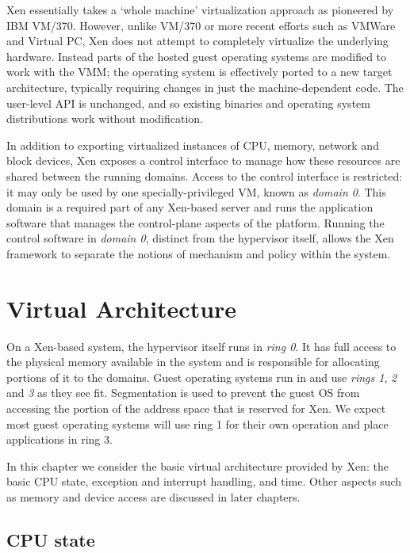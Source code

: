 \documentclass[11pt,twoside,final,openright]{xenstyle}
\begin{document}
Xen essentially takes a `whole machine' virtualization approach as
pioneered by IBM VM/370.  However, unlike VM/370 or more recent
efforts such as VMWare and Virtual PC, Xen does not attempt to
completely virtualize the underlying hardware.  Instead parts of the
hosted guest operating systems are modified to work with the VMM; the
operating system is effectively ported to a new target architecture,
typically requiring changes in just the machine-dependent code.  The
user-level API is unchanged, and so existing binaries and operating
system distributions work without modification.

In addition to exporting virtualized instances of CPU, memory, network
and block devices, Xen exposes a control interface to manage how these
resources are shared between the running domains. Access to the
control interface is restricted: it may only be used by one
specially-privileged VM, known as {\em domain 0}.  This domain is a
required part of any Xen-based server and runs the application software
that manages the control-plane aspects of the platform.  Running the
control software in {\it domain 0}, distinct from the hypervisor
itself, allows the Xen framework to separate the notions of 
mechanism and policy within the system.



\chapter{Virtual Architecture}

On a Xen-based system, the hypervisor itself runs in {\it ring 0}.  It
has full access to the physical memory available in the system and is
responsible for allocating portions of it to the domains.  Guest
operating systems run in and use {\it rings 1}, {\it 2} and {\it 3} as
they see fit. Segmentation is used to prevent the guest OS from
accessing the portion of the address space that is reserved for
Xen. We expect most guest operating systems will use ring 1 for their
own operation and place applications in ring 3.

In this chapter we consider the basic virtual architecture provided 
by Xen: the basic CPU state, exception and interrupt handling, and
time. Other aspects such as memory and device access are discussed 
in later chapters. 

\section{CPU state}
\end{document}
